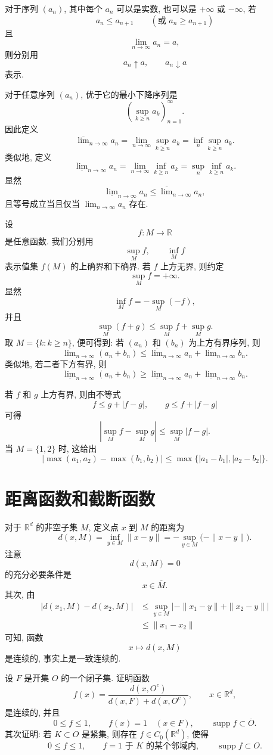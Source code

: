 对于序列 \((a_n)\), 其中每个 \(a_n\) 可以是实数, 也可以是 \(+\infty\) 或 \(-\infty\), 若
\[
a_n\leq a_{n+1}
\qquad
(\text{或 }a_n\geq a_{n+1})
\]
且
\[
\lim_{n\to\infty}a_n=a,
\]
则分别用
\[
a_n\uparrow a,
\qquad
a_n\downarrow a
\]
表示.

对于任意序列 \((a_n)\), 优于它的最小下降序列是
\[
\left(\sup_{k\geq n}a_k\right)_{n=1}^{\infty}.
\]
因此定义
\[
\overline{\lim}_{n\to\infty}a_n
=
\lim_{n\to\infty}\sup_{k\geq n}a_k
=
\inf_n\sup_{k\geq n}a_k.
\]
类似地, 定义
\[
\underline{\lim}_{n\to\infty}a_n
=
\lim_{n\to\infty}\inf_{k\geq n}a_k
=
\sup_n\inf_{k\geq n}a_k.
\]
显然
\[
\underline{\lim}_{n\to\infty}a_n
\leq
\overline{\lim}_{n\to\infty}a_n,
\]
且等号成立当且仅当 \(\lim_{n\to\infty}a_n\) 存在.

设
\[
f:M\longrightarrow\mathbb R
\]
是任意函数. 我们分别用
\[
\sup_M f,
\qquad
\inf_M f
\]
表示值集 \(f(M)\) 的上确界和下确界. 若 \(f\) 上方无界, 则约定
\[
\sup_M f=+\infty.
\]
显然
\[
\inf_M f=-\sup_M(-f),
\]
并且
\[
\sup_M(f+g)
\leq
\sup_M f+
\sup_M g.
\]
取 \(M=\{k:k\geq n\}\), 便可得到: 若 \((a_n)\) 和 \((b_n)\) 为上方有界序列, 则
\[
\overline{\lim}_{n\to\infty}(a_n+b_n)
\leq
\overline{\lim}_{n\to\infty}a_n
+
\overline{\lim}_{n\to\infty}b_n.
\]
类似地, 若二者下方有界, 则
\[
\underline{\lim}_{n\to\infty}(a_n+b_n)
\geq
\underline{\lim}_{n\to\infty}a_n
+
\underline{\lim}_{n\to\infty}b_n.
\]

若 \(f\) 和 \(g\) 上方有界, 则由不等式
\[
f\leq g+|f-g|,
\qquad
g\leq f+|f-g|
\]
可得
\[
\left|\sup_M f-\sup_M g\right|
\leq
\sup_M|f-g|.
\]
当 \(M=\{1,2\}\) 时, 这给出
\[
\left|\max(a_1,a_2)-\max(b_1,b_2)\right|
\leq
\max\{|a_1-b_1|,|a_2-b_2|\}.
\]

\section{距离函数和截断函数}
\label{app:distance-function-cutoff}

对于 \(\mathbb R^d\) 的非空子集 \(M\), 定义点 \(x\) 到 \(M\) 的距离为
\[
d(x,M)=\inf_{y\in M}\|x-y\|
=
-\sup_{y\in M}\bigl(-\|x-y\|\bigr).
\]
注意
\[
d(x,M)=0
\]
的充分必要条件是
\[
x\in\overline M.
\]
其次, 由
\begin{align*}
	\left|d(x_1,M)-d(x_2,M)\right|
	&\leq
	\sup_{y\in M}\left|-\|x_1-y\|+\|x_2-y\|\right|\\
	&\leq \|x_1-x_2\|
\end{align*}
可知, 函数
\[
x\longmapsto d(x,M)
\]
是连续的, 事实上是一致连续的.

\begin{exer}
	\label{exer:distance-cutoff-open-closed}
	设 \(F\) 是开集 \(O\) 的一个闭子集. 证明函数
	\[
	f(x)=
	\frac{d(x,O^c)}{d(x,F)+d(x,O^c)},
	\qquad x\in\mathbb R^d,
	\]
	是连续的, 并且
	\[
	0\leq f\leq1,
	\qquad
	f(x)=1\quad(x\in F),
	\qquad
	\operatorname{supp}f\subset \overline O.
	\]
	其次证明: 若 \(K\subset O\) 是紧集, 则存在 \(f\in C_0(\mathbb R^d)\), 使得
	\[
	0\leq f\leq1,
	\qquad
	f=1\text{ 于 }K\text{ 的某个邻域内},
	\qquad
	\operatorname{supp}f\subset O.
	\]
\end{exer}

